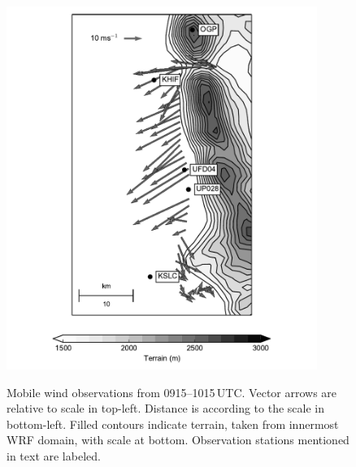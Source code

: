 \documentclass[pdftex,12pt]{article}
\begin{document}
\begin{figure}[t]
\centering
\includegraphics[width=0.9\textwidth]{mobmes_09.pdf}\\
\caption{Mobile wind observations from 0915--1015\,UTC. Vector arrows are relative to scale in top-left. Distance is according to the scale in bottom-left. Filled contours indicate terrain, taken from innermost WRF domain, with scale at bottom. Observation stations mentioned in text are labeled.}
\label{fig:mobmes}
\end{figure}
\end{document}
